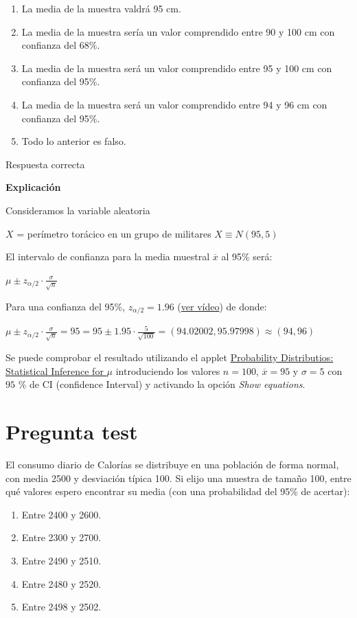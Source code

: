 \documentclass[
]{book}
\providecommand{\tightlist}{%
  \setlength{\itemsep}{0pt}\setlength{\parskip}{0pt}}
\begin{document}
\begin{enumerate}
\def\labelenumi{\alph{enumi})}
\tightlist
\item
  La media de la muestra valdrá 95 cm.
\item
  La media de la muestra sería un valor comprendido entre 90 y 100 cm con confianza del 68\%.
\item
  La media de la muestra será un valor comprendido entre 95 y 100 cm con confianza del 95\%.
\item
  La media de la muestra será un valor comprendido entre 94 y 96 cm con confianza del 95\%.
\item
  Todo lo anterior es falso.
\end{enumerate}

Respuesta correcta

\textbf{Explicación}

Consideramos la variable aleatoria

\(X\) = perímetro torácico en un grupo de militares \(X \equiv N(95, 5)\)

El intervalo de confianza para la media muestral \(\overline{x}\) al 95\% será:

\(\mu \pm z_{\alpha/2} \cdot \frac{\sigma}{\sqrt{n}}\)

Para una confianza del 95\%, \(z_{\alpha/2} = 1.96\) (\href{https://youtu.be/wWeogWp_bO8}{ver vídeo}) de donde:

\(\mu \pm z_{\alpha/2} \cdot \frac{\sigma}{\sqrt{n}}= 95 = 95 \pm 1.95 \cdot \frac{5}{\sqrt{100}}= (94.02002,95.97998) \approx (94, 96)\)

Se puede comprobar el resultado utilizando el applet \href{https://homepage.divms.uiowa.edu/~mbognar/applets/mu.raw.html}{Probability Distributios: Statistical Inference for \(\mu\)} introduciendo los valores \(n=100\), \(\overline{x}=95\) y \(\sigma = 5\) con \(95\) \% de CI (confidence Interval) y activando la opción \emph{Show equations}.

\hypertarget{pregunta-test-98}{%
\section{Pregunta test}\label{pregunta-test-98}}

El consumo diario de Calorías se distribuye en una población de forma normal, con media 2500 y desviación típica 100. Si elijo una muestra de tamaño 100, entre qué valores espero encontrar su media (con una probabilidad del 95\% de acertar):

\begin{enumerate}
\def\labelenumi{\alph{enumi})}
\tightlist
\item
  Entre 2400 y 2600.
\item
  Entre 2300 y 2700.
\item
  Entre 2490 y 2510.
\item
  Entre 2480 y 2520.
\item
  Entre 2498 y 2502.
\end{enumerate}
\end{document}
